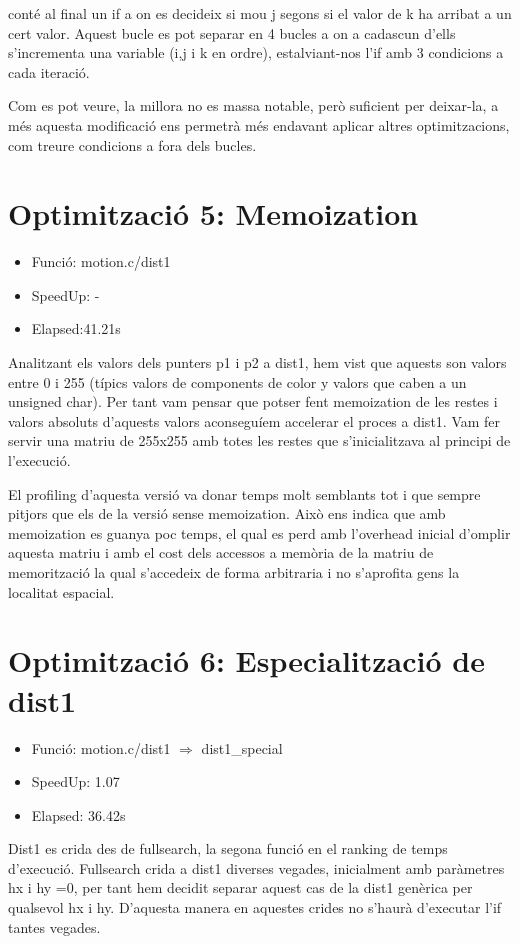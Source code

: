 conté al final un if a on es decideix si mou j segons si el valor de k ha arribat a un cert valor. Aquest bucle es pot separar en 4 bucles a on a cadascun d'ells s'incrementa una variable (i,j i k en ordre), estalviant-nos l'if amb 3 condicions a cada iteració.

Com es pot veure, la millora no es massa notable, però suficient per deixar-la, a més aquesta modificació ens permetrà més endavant aplicar altres optimitzacions, com treure condicions a fora dels bucles.

\section{Optimitzaci\'o 5: Memoization}
\begin{itemize}
\item{Funció: motion.c/dist1}
\item{SpeedUp: -}
\item{Elapsed:41.21s} 
\end{itemize}

Analitzant els valors dels punters p1 i p2 a dist1, hem vist que aquests son valors entre 0 i 255  (típics valors de components de color y valors que caben a un unsigned char). Per tant vam pensar que potser fent memoization de les restes i valors absoluts d'aquests valors aconseguíem accelerar el proces a dist1. Vam fer servir una matriu de 255x255 amb totes les restes que s'inicialitzava al principi de l'execució. 

El profiling d'aquesta versió va donar temps molt semblants tot i que sempre pitjors que els de la versió sense memoization. Això ens indica que amb memoization es guanya poc temps, el qual es perd amb l'overhead inicial d'omplir aquesta matriu i amb el cost dels accessos a memòria de la matriu de memorització la qual s'accedeix de forma arbitraria i no s'aprofita gens la localitat espacial.

\section{Optimitzaci\'o 6: Especialitzaci\'o de dist1}
\begin{itemize}
\item{Funció: motion.c/dist1 $\Rightarrow$ dist1\_special}
\item{SpeedUp: 1.07}
\item{Elapsed: 36.42s}
\end{itemize}

Dist1 es crida des de fullsearch, la segona funció en el ranking de temps d'execució. Fullsearch crida a dist1 diverses vegades, inicialment amb paràmetres hx i hy =0, per tant hem decidit separar aquest cas de la dist1 genèrica per qualsevol hx i hy. D'aquesta manera en aquestes crides no s'haurà d'executar l'if tantes vegades.

